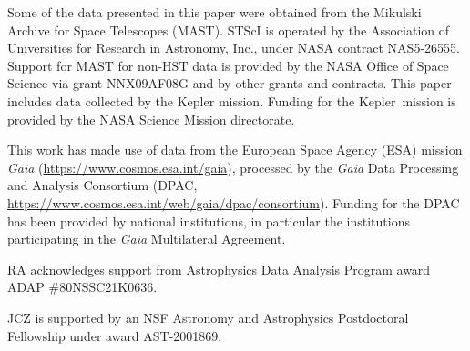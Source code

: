 \documentclass[]{aastex631}
\newcommand{\Kepler}{{Kepler}}
\begin{document}
Some of the data presented in this paper were obtained from the Mikulski
Archive for Space Telescopes (MAST).
STScI is operated by the Association of Universities for Research in
Astronomy, Inc., under NASA contract NAS5-26555.
Support for MAST for non-HST data is provided by the NASA Office of Space
Science via grant NNX09AF08G and by other grants and contracts.
This paper includes data collected by the Kepler mission. Funding for the
\Kepler\ mission is provided by the NASA Science Mission directorate.

This work has made use of data from the European Space Agency (ESA) mission
{\it Gaia} (\url{https://www.cosmos.esa.int/gaia}), processed by the {\it
Gaia} Data Processing and Analysis Consortium (DPAC,
\url{https://www.cosmos.esa.int/web/gaia/dpac/consortium}).
Funding for the DPAC has been provided by national institutions, in particular
the institutions participating in the {\it Gaia} Multilateral Agreement.

RA acknowledges support from Astrophysics Data Analysis Program award ADAP
\#80NSSC21K0636.

JCZ is supported by an NSF Astronomy and Astrophysics Postdoctoral Fellowship
under award AST-2001869.



{}

\end{document}
